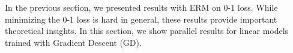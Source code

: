 
In the previous section, 
we presented results with ERM on 0-1 loss. 
While minimizing the 0-1 loss is hard in general,
these results provide important theoretical insights. 
In this section, %
we show parallel results for linear models 
trained with Gradient Descent (GD).  




